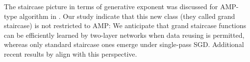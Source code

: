 The staircase picture in terms of generative exponent was discussed for AMP-type algorithm in \cite{troiani2024fundamental}. Our study indicate that this new class (they called grand staircase) is not restricted to AMP: We anticipate that grand staircase functions can be efficiently learned by two-layer networks when data reusing is permitted, whereas only standard staircase ones emerge  under single-pass SGD. Additional recent results by \citep{joshi2024complexity}  align with this perspective. 


    
